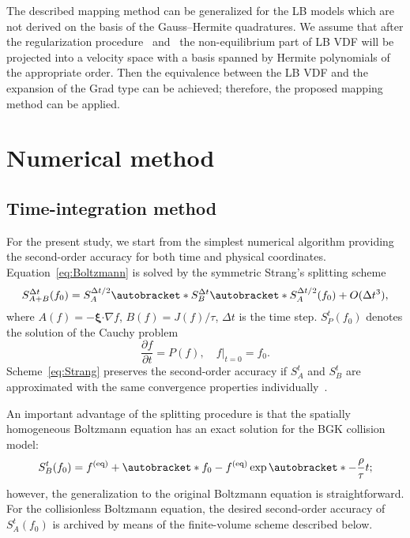 \documentclass{elsarticle} %
\newcommand{\pder}[2][]{\frac{\partial#1}{\partial#2}}
\newcommand{\OO}[1]{O(#1)}
\DeclarePairedDelimiter\autobracket()       %
\newcommand{\br}[1]{\autobracket*{#1}}
\newcommand{\bxi}{\boldsymbol{\xi}}
\newcommand{\bdot}{\boldsymbol{\cdot}}
\newcommand{\equil}[1]{#1^\mathrm{(eq)}}
\begin{document}
The described mapping method can be generalized for the LB models
which are not derived on the basis of the Gauss--Hermite quadratures.
We assume that after the regularization procedure~\cite{Latt2006, Chen2006}
and~\cite{Zhang2006, Mont2015, Mattila2017}
the non-equilibrium part of LB VDF will be projected into a velocity space
with a basis spanned by Hermite polynomials of the appropriate order.
Then the equivalence between the LB VDF and the expansion of the Grad type can be achieved;
therefore, the proposed mapping method can be applied.

\section{Numerical method}\label{sec:numerics}

\subsection{Time-integration method}\label{sec:numerics:splitting}

For the present study, we start from the simplest numerical algorithm providing the second-order accuracy
for both time and physical coordinates.
Equation~\eqref{eq:Boltzmann} is solved by the symmetric Strang's splitting scheme
\begin{equation}\label{eq:Strang}
    S^{\Delta{t}}_{A+B}(f_0) = S^{\Delta{t}/2}_A \br{S^{\Delta{t}}_B \br{S^{\Delta{t}/2}_A(f_0)} } + \OO{\Delta{t}^3},
\end{equation}
where \(A(f) = -\bxi\bdot\nabla{f}\), \(B(f) = J(f)/\tau\), \(\Delta{t}\) is the time step.
\(S^t_P(f_0)\) denotes the solution of the Cauchy problem
\begin{equation}\label{eq:Cauchy}
    \pder[f]{t} = P(f), \quad f|_{t=0} = f_0.
\end{equation}
Scheme~\eqref{eq:Strang} preserves the second-order accuracy if \(S^t_A\) and \(S^t_B\)
are approximated with the same convergence properties individually~\cite{Bobylev2001}.

An important advantage of the splitting procedure is that the spatially homogeneous Boltzmann equation
has an exact solution for the BGK collision model:
\begin{equation}\label{eq:bgk_exact}
    S^t_B(f_0) = \equil{f} + \br{f_0-\equil{f}}\exp\br{-\frac\rho\tau t};
\end{equation}
however, the generalization to the original Boltzmann equation is straightforward.
For the collisionless Boltzmann equation, the desired second-order accuracy of \(S^t_A(f_0)\)
is archived by means of the finite-volume scheme described below.
\end{document}
